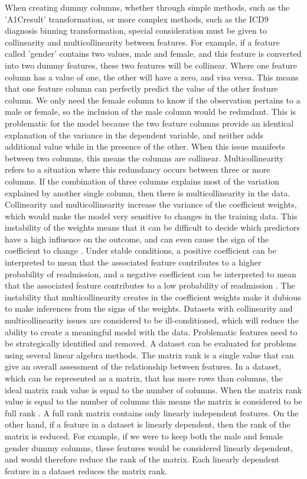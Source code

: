 \documentclass[sigconf]{acmart}
\begin{document}
When creating dummy columns, whether through simple methods, such as the 'A1Cresult' transformation, or more complex methods, such as the ICD9 diagnosis binning transformation, special consideration must be given to collinearity and multicollinearity between features. For example, if a feature called 'gender' contains two values, male and female, and this feature is converted into two dummy features, these two features will be collinear. Where one feature column has a value of one, the other will have a zero, and visa versa. This means that one feature column can perfectly predict the value of the other feature column. We only need the female column to know if the observation pertains to a male or female, so the inclusion of the male column would be redundant. This is problematic for the model because the two feature columns provide an identical explanation of the variance in the dependent variable, and neither adds additional value while in the presence of the other. When this issue manifests between two columns, this means the columns are collinear. Multicollinearity refers to a situation where this redundancy occurs between three or more columns. If the combination of three columns explains most of the variation explained by another single column, then there is multicollinearity in the data.
Collinearity and multicollinearity increase the variance of the coefficient weights, which would make the model very sensitive to changes in the training data. This instability of the weights means that it can be difficult to decide which predictors have a high influence on the outcome, and can even cause the sign of the coefficient to change \cite{cite16}. Under stable conditions, a positive coefficient can be interpreted to mean that the associated feature contributes to a higher probability of readmission, and a negative coefficient can be interpreted to mean that the associated feature contributes to a low probability of readmission \cite{cite03}. The instability that multicollinearity creates in the coefficient weights make it dubious to make inferences from the signs of the weights.
Datasets with collinearity and multicollinearity issues are considered to be ill-conditioned, which will reduce the ability to create a meaningful model with the data. Problematic features need to be strategically identified and removed. A dataset can be evaluated for problems using several linear algebra methods. The matrix rank is a single value that can give an overall assessment of the relationship between features. In a dataset, which can be represented as a matrix, that has more rows than columns, the ideal matrix rank value is equal to the number of columns. When the matrix rank value is equal to the number of columns this means the matrix is considered to be full rank \cite{cite14}. A full rank matrix contains only linearly independent features. On the other hand, if a feature in a dataset is linearly dependent, then the rank of the matrix is reduced. For example, if we were to keep both the male and female gender dummy columns, these features would be considered linearly dependent, and would therefore reduce the rank of the matrix. Each linearly dependent feature in a dataset reduces the matrix rank.
\end{document}
